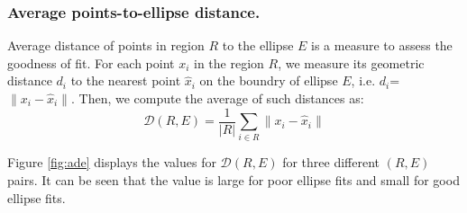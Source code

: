\documentclass[preprint]{iucr}              %
\newcommand{\norm}[1]{\left\lVert #1 \right\rVert}
\begin{document}
\subsubsection{Average points-to-ellipse distance.}
Average distance of points in region $R$ to the ellipse $E$ is a measure to assess the goodness of fit. For each point $x_i$ in the region $R$, we measure its geometric distance $d_i$ to the nearest point $\hat{x}_i$ on the boundry of ellipse $E$, i.e. $d_i$=$\norm{x_i - \hat{x}_i}$. Then, we compute the average of such distances as:
\begin{equation} \label{eq:ADE}
    \mathcal{D}(R,E) = \frac{1}{\lvert R \rvert}  \sum_{i \in R} \norm{x_i - \hat{x}_i} 
\end{equation}

Figure \ref{fig:ade} displays the values for $\mathcal{D}(R,E)$ for three different $(R, E)$ pairs. It can be seen that the value is large for poor ellipse fits and small for good ellipse fits.
\end{document}

